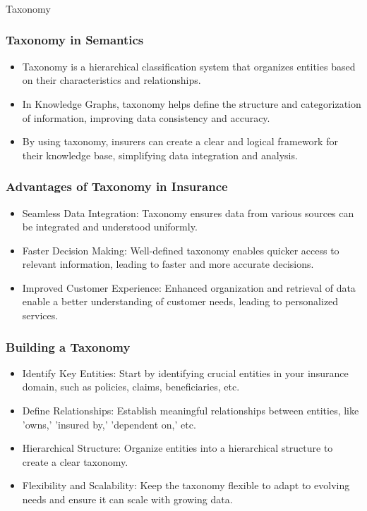 \begin{frame}[fragile]\frametitle{}
\begin{center}
{\Large Taxonomy}
\end{center}
\end{frame}


\begin{frame}[fragile]
\frametitle{Taxonomy in Semantics}
\begin{itemize}
\item Taxonomy is a hierarchical classification system that organizes entities based on their characteristics and relationships.
\item In Knowledge Graphs, taxonomy helps define the structure and categorization of information, improving data consistency and accuracy.
\item By using taxonomy, insurers can create a clear and logical framework for their knowledge base, simplifying data integration and analysis.
\end{itemize}
\end{frame}

\begin{frame}[fragile]
\frametitle{Advantages of Taxonomy in Insurance}
\begin{itemize}
\item Seamless Data Integration: Taxonomy ensures data from various sources can be integrated and understood uniformly.
\item Faster Decision Making: Well-defined taxonomy enables quicker access to relevant information, leading to faster and more accurate decisions.
\item Improved Customer Experience: Enhanced organization and retrieval of data enable a better understanding of customer needs, leading to personalized services.
\end{itemize}
\end{frame}

\begin{frame}[fragile]
\frametitle{Building a Taxonomy}
\begin{itemize}
\item Identify Key Entities: Start by identifying crucial entities in your insurance domain, such as policies, claims, beneficiaries, etc.
\item Define Relationships: Establish meaningful relationships between entities, like 'owns,' 'insured by,' 'dependent on,' etc.
\item Hierarchical Structure: Organize entities into a hierarchical structure to create a clear taxonomy.
\item Flexibility and Scalability: Keep the taxonomy flexible to adapt to evolving needs and ensure it can scale with growing data.
\end{itemize}
\end{frame}

